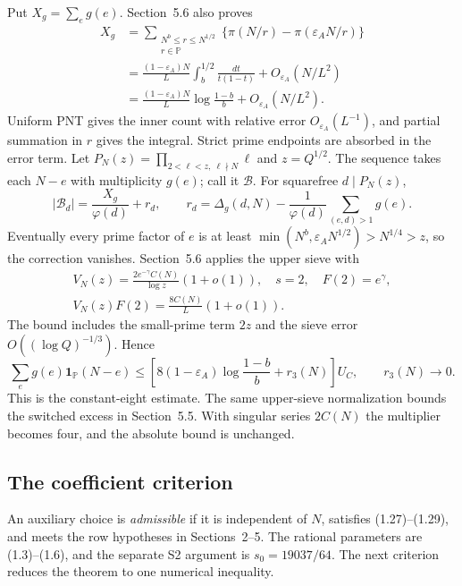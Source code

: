 Put $X_g=\sum_e g(e)$. Section~5.6 also proves
\[
 \begin{aligned}
 X_g
 &=\sum_{\substack{N^b\le r\le N^{1/2}\\r\in\mathbb P}}
       \{\pi(N/r)-\pi(\varepsilon_A N/r)\}\\
 &=\frac{(1-\varepsilon_A)N}{L}
       \int_b^{1/2}\frac{dt}{t(1-t)}+O_{\varepsilon_A}(N/L^2)\\
 &=\frac{(1-\varepsilon_A)N}{L}
       \log\frac{1-b}{b}+O_{\varepsilon_A}(N/L^2).
 \end{aligned}                                               \tag{1.18}
\]
Uniform PNT gives the inner count with relative error $O_{\varepsilon_A}(L^{-1})$,
and partial summation in $r$ gives the integral.
Strict prime endpoints are absorbed in the error term.
Let $P_N(z)=\prod_{2<\ell<z,\ \ell\nmid N}\ell$ and $z=Q^{1/2}$.
The sequence takes each $N-e$ with multiplicity $g(e)$; call it $\mathcal B$.
For squarefree $d\mid P_N(z)$,
\[
 |\mathcal B_d|=\frac{X_g}{\varphi(d)}+r_d,\qquad
 r_d=\Delta_g(d,N)-\frac1{\varphi(d)}
                                      \sum_{(e,d)>1}g(e).    \tag{1.19}
\]
Eventually every prime factor of $e$ is at least
$\min(N^b,\varepsilon_A N^{1/2})>N^{1/4}>z$,
so the correction vanishes.
Section~5.6 applies the upper sieve with
\[
 \begin{gathered}
 V_N(z)=\frac{2e^{-\gamma}C(N)}{\log z}(1+o(1)),\quad s=2,\quad F(2)=e^\gamma,\\
 V_N(z)F(2)=\frac{8C(N)}L(1+o(1)).
 \end{gathered}
\]
The bound includes the small-prime term $2z$ and the sieve error
$O((\log Q)^{-1/3})$. Hence
\[
 \sum_e g(e)\mathbf1_{\mathbb P}(N-e)
 \le\left[8(1-\varepsilon_A)\log\frac{1-b}{b}
                   +r_3(N)\right]U_C,\qquad r_3(N)\to0.     \tag{1.20}
\]
This is the constant-eight estimate.
The same upper-sieve normalization bounds the switched excess in Section~5.5.
With singular series $2C(N)$ the multiplier becomes four,
and the absolute bound is unchanged.

\subsection{The coefficient criterion}
An auxiliary choice is \emph{admissible} if it is independent of $N$,
satisfies (1.27)--(1.29), and meets the row hypotheses in Sections~2--5.
The rational parameters are (1.3)--(1.6),
and the separate S2 argument is $s_0=19037/64$.
The next criterion reduces the theorem to one numerical inequality.

